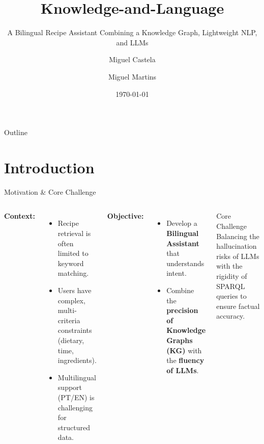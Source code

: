 \documentclass[t, 10pt, handout, aspectratio=169]{beamer}
\title[Knowledge-and-Language]{Knowledge-and-Language}
\subtitle{A Bilingual Recipe Assistant Combining a Knowledge Graph, Lightweight NLP, and LLMs}
\author[M. Castela, M. Martins]{Miguel Castela \and Miguel Martins}
\institute[UC]{University of Coimbra \\ Department of Informatics Engineering}
\date{\today}
\begin{document}
\begin{frame}
  \titlepage
\end{frame}

\begin{frame}{Outline}
  \tableofcontents
\end{frame}

\section{Introduction}
\begin{frame}{Motivation \& Core Challenge}
  \begin{columns}
      \textbf{Context:}
      \begin{itemize}
        \item Recipe retrieval is often limited to keyword matching.
        \item Users have complex, multi-criteria constraints (dietary, time, ingredients).
        \item Multilingual support (PT/EN) is challenging for structured data.
      \end{itemize}
      
      \vspace{1em}
      \textbf{Objective:}
      \begin{itemize}
        \item Develop a \textbf{Bilingual Assistant} that understands intent.
        \item Combine the \textbf{precision of Knowledge Graphs (KG)} with the \textbf{fluency of LLMs}.
      \end{itemize}

      \begin{alertblock}{Core Challenge}
        \justifying
        Balancing the hallucination risks of LLMs with the rigidity of SPARQL queries to ensure factual accuracy.
      \end{alertblock}
  \end{columns}
\end{frame}

\end{document}
